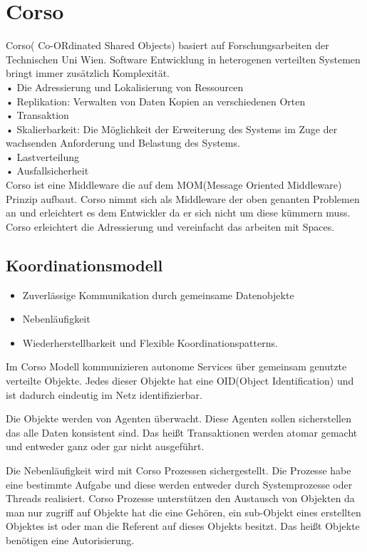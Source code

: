 \documentclass[a4paper,12pt]{scrreprt}
\begin{document}
		\section{Corso} %
			Corso( Co-ORdinated Shared Objects) basiert auf Forschungsarbeiten der Technischen Uni Wien.
			Software Entwicklung in heterogenen verteilten Systemen bringt immer zusätzlich Komplexität.\\
			•	Die Adressierung und Lokalisierung von Ressourcen\\
			•	Replikation: Verwalten von Daten Kopien an verschiedenen Orten\\
			•	Transaktion\\
			•	Skalierbarkeit: Die Möglichkeit der Erweiterung des Systems im Zuge der wachsenden Anforderung und Belastung des Systems.\\
			•	Lastverteilung\\
			•	Ausfallsicherheit\\
			Corso ist eine Middleware die auf dem MOM(Message Oriented Middleware) Prinzip aufbaut. Corso nimmt sich als Middleware der oben genanten Problemen an und erleichtert es dem Entwickler da er sich nicht um diese kümmern muss. Corso erleichtert die Adressierung und vereinfacht das arbeiten mit Spaces.\\
			
			\subsection{Koordinationsmodell}
			
			\begin{itemize}
			\item Zuverlässige Kommunikation durch gemeinsame Datenobjekte
			\item Nebenläufigkeit
			\item Wiederherstellbarkeit und Flexible Koordinationspatterns.
			\end{itemize}
			
			Im Corso Modell kommunizieren autonome Services über gemeinsam genutzte verteilte Objekte. Jedes dieser Objekte hat eine OID(Object Identification) und ist dadurch eindeutig im Netz identifizierbar.
			
			Die Objekte werden von Agenten überwacht. Diese Agenten sollen sicherstellen das alle Daten konsistent sind. Das heißt Transaktionen werden atomar gemacht und entweder ganz oder gar nicht ausgeführt.
			
			Die Nebenläufigkeit wird mit Corso Prozessen sichergestellt. Die Prozesse habe eine bestimmte Aufgabe und diese werden entweder durch Systemprozesse oder Threads realisiert.
			Corso Prozesse unterstützen den Austausch von Objekten da man nur zugriff auf Objekte hat die eine Gehören, ein sub-Objekt eines erstellten Objektes ist oder man die Referent auf dieses Objekts besitzt.
			Das heißt Objekte benötigen eine Autorisierung.
			
\end{document}
